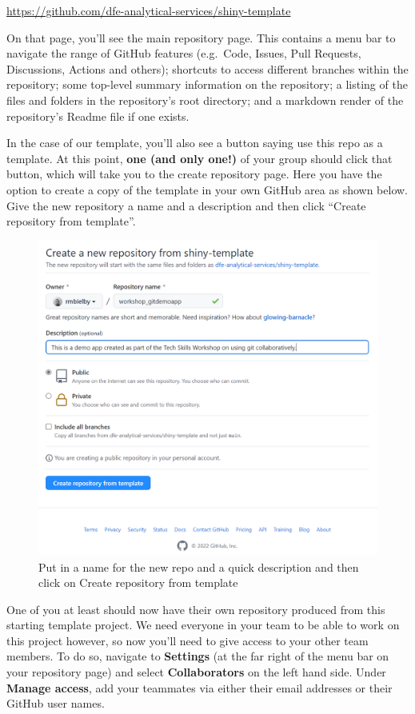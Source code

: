 \documentclass[
  12pt,
]{article}
\begin{document}
\url{https://github.com/dfe-analytical-services/shiny-template}

On that page, you'll see the main repository page. This contains a menu
bar to navigate the range of GitHub features (e.g.~Code, Issues, Pull
Requests, Discussions, Actions and others); shortcuts to access
different branches within the repository; some top-level summary
information on the repository; a listing of the files and folders in the
repository's root directory; and a markdown render of the repository's
Readme file if one exists.

In the case of our template, you'll also see a button saying use this
repo as a template. At this point, \textbf{one (and only one!)} of your
group should click that button, which will take you to the create
repository page. Here you have the option to create a copy of the
template in your own GitHub area as shown below. Give the new repository
a name and a description and then click ``Create repository from
template''.

\begin{figure}
\includegraphics[width=0.72\linewidth]{images/gitdemo/gitdemo-shinydash-newrepofromtemplate} \caption{Put in a name for the new repo and a quick description and then click on Create repository from template}\label{fig:unnamed-chunk-3}
\end{figure}

One of you at least should now have their own repository produced from
this starting template project. We need everyone in your team to be able
to work on this project however, so now you'll need to give access to
your other team members. To do so, navigate to \textbf{Settings} (at the
far right of the menu bar on your repository page) and select
\textbf{Collaborators} on the left hand side. Under \textbf{Manage
access}, add your teammates via either their email addresses or their
GitHub user names.
\end{document}
